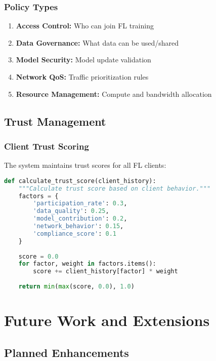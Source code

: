 \documentclass[12pt,a4paper,twoside]{article}
\begin{document}
\subsubsection{Policy Types}

\begin{enumerate}
    \item \textbf{Access Control:} Who can join FL training
    \item \textbf{Data Governance:} What data can be used/shared
    \item \textbf{Model Security:} Model update validation
    \item \textbf{Network QoS:} Traffic prioritization rules
    \item \textbf{Resource Management:} Compute and bandwidth allocation
\end{enumerate}

\subsection{Trust Management}

\subsubsection{Client Trust Scoring}

The system maintains trust scores for all FL clients:

\begin{lstlisting}[language=python, caption=Trust Score Calculation]
def calculate_trust_score(client_history):
    """Calculate trust score based on client behavior."""
    factors = {
        'participation_rate': 0.3,
        'data_quality': 0.25,
        'model_contribution': 0.2,
        'network_behavior': 0.15,
        'compliance_score': 0.1
    }
    
    score = 0.0
    for factor, weight in factors.items():
        score += client_history[factor] * weight
    
    return min(max(score, 0.0), 1.0)
\end{lstlisting}

\section{Future Work and Extensions}

\subsection{Planned Enhancements}
\end{document}
